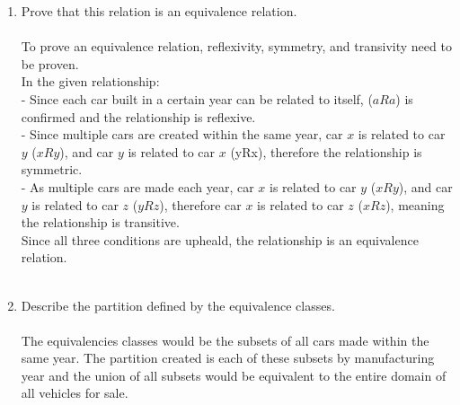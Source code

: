 \documentclass{amsart}
\theoremstyle{definition}
\theoremstyle{Exercise}
\theoremstyle{remark}
\theoremstyle{rule}
\numberwithin{equation}{section}
\begin{document}
  \begin{enumerate}[label=(\alph*)]
    \item Prove that this relation is an equivalence relation.
\\\\
  To prove an equivalence relation, reflexivity, symmetry, and transivity need to be proven.\\
  In the given relationship:\\
  - Since each car built in a certain year can be related to itself, ($aRa$) is confirmed and the relationship is reflexive.\\
  - Since multiple cars are created within the same year, car $x$ is related to car $y$ ($xRy$), and car $y$ is related to car $x$ (yRx), therefore the relationship is symmetric.\\
  - As multiple cars are made each year, car $x$ is related to car $y$ ($xRy$), and car $y$ is related to car $z$ ($yRz$), therefore car $x$ is related to car $z$ ($xRz$), meaning the relationship is transitive.\\
  Since all three conditions are upheald, the relationship is an equivalence relation.
\\\\
    \item Describe the partition defined by the equivalence classes.
\\\\
  The equivalencies classes would be the subsets of all cars made within the same year. The partition created is each of these subsets by manufacturing year 
  and the union of all subsets would be equivalent to the entire domain of all vehicles for sale.
  \end{enumerate}
\newpage
~\\
\end{document}
